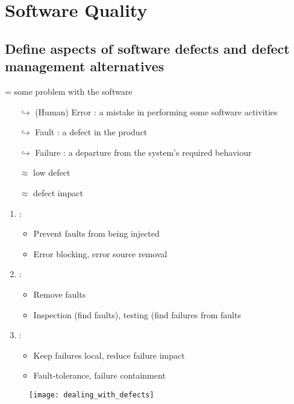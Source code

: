 \chapter{Software Quality}

\section{Define aspects of software defects and defect management alternatives}

 = some problem with the software
\begin{itemize}
    \item[$\hookrightarrow$] (Human) Error : a mistake in performing some software activities
    \item[$\hookrightarrow$] Fault : a defect in the product
    \item[$\hookrightarrow$] Failure : a departure from the system's required behaviour
    \item[]  $\approx$ low defect
    \item[]  $\approx$ defect impact
\end{itemize}


\begin{minipage}{0.48\textwidth}
\begin{enumerate}
        \item {} :
        \begin{itemize}
            \item  Prevent faults from being injected
            \item  Error blocking, error source removal
        \end{itemize}
        \item {} :
        \begin{itemize}
            \item  Remove faults
            \item  Inspection (find faults), testing (find failures from faults
        \end{itemize}
        \item {} :
        \begin{itemize}
            \item  Keep failures local, reduce failure impact
            \item  Fault-tolerance, failure containment
        \end{itemize}
    \end{enumerate}
\end{minipage}
\hfill
\begin{minipage}{0.48\textwidth}
    \begin{figure}[H]
        \centering
        \texttt{[image: dealing\_with\_defects]}
    \end{figure}
\end{minipage}

